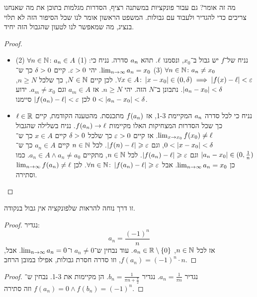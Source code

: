 \documentclass[name=רשימות חשבון דיפרנציאלי ואינטגרלי 1א]{../../../tex/classes/megasumPreamble}
\begin{document}
	מה זה אומר? גם עבור פונקציות במשתנה רציף, הסדרות מגלמות בתוכן את מה שאנחנו צריכים כדי להגדיר ולעבוד עם גבולות. המשפט הראשון אומר לנו שכל הסיפור הזה לא תלוי בנציג, מה שמאפשר לנו לטעון שהגבול הזה יחיד.
	\begin{proof}
		\begin{itemize}
			\item[$\impliedby$]נניח של־$f$ יש גבול ב־$x_0$, ונסמנו $\ml$. תהא $\an$ סדרה. נניח כי: (1) $\forall n \in\N \co a_n \in A$ (2) $\forall n \in \N \co a_n \neq x_0$ (3) $\limsi a_n = x_0$. יהי $\eg > 0$. קיים $\dg > 0$ כך ש־$\forall x \in A \co \sof{x - x_0} \in (0, \dg) \implies \sof{f(x) - \ml} < \eg$. לכן קיים $N \in \N$, כך שלכל $n \ge N$, $\sof{a_n- x_0} < \dg$. נתבונן ב־$N$ הזה. יהי $n \ge N$. אז $a_m \in A$ וגם $a_m \neq x_0$. ידוע $0 < \sof{a_n - x_0} < \dg$ לכן $\sof{f(a_n) - \ml} < \eg$ סיימנו.
			\item[$\implies$]נניח כי לכל סדרה $\an$ המקיימת 1-3, אז $f(\an)$ מתכנסת. מהטענה הקודמת, קיים $\ml \in \R$ כך שכל הסדרות המצחיקות האלו מקיימות $f(\an) \to \ml$. נניח בשלילה שהגבול $\lim_{x \to x_0}f(x_0) \neq \ml$. אז קיים $\eg > 0$ כך שלכל $\dg > 0$ קיים $x \in A$ כך ש־$0 < \sof{x -x_0} < \dg$, וגם $\sof{f(n) - \ml}\ge \eg$. לכל $n \in \N$ קיים $a_n \in A$ כך ש־$\sof{a_n - x_0} \in (0, \frac{1}{n})$ וגם $\sof{f(a_n) - \ml} \ge \eg$. לכל $n \in \N$, מתקיים $a_n \in A \land a_n \neq a_0$. כמו כן $\limsi a_n = x_0$. אבל $\forall n \in \N\co \sof{f(a_n) - \ml}\ge \eg$. לכן $\limsi f(\an) \neq \ml$ וסתירה.
		\end{itemize}\envendproof
	\end{proof}


	זו דרך נוחה להראות שלפונקציה \textit{אין} גבול בנקודה.
	\begin{proof}
		נגדיר:
		\[ a_n = \frac{(-1)^{n}}{n} \]
		אז לכל $n \in \N$, $a_n \in \R\setminus \{0\}$. עוד נבחין ש־$a_n \neq 0$ ו־$\limsi a_n= 0$. אבל, $f(a_n) = (-1)^{n} \cdot n$, וזו סדרה חסרת גבולות, אפילו במובן הרחב.
	\end{proof}

	\begin{proof}
		נגדיר $a_n = \frac{1}{\pi n}$. נגדיר $b_n = \frac{1}{\pi n + \frac{\pi}{2}}$. הן מקיימות את 1-3. נבחין ש־$f(a_n) =0 \land f(b_n) = (-1)^{n}$ וזה סתירה.
	\end{proof}
	
\end{document}
